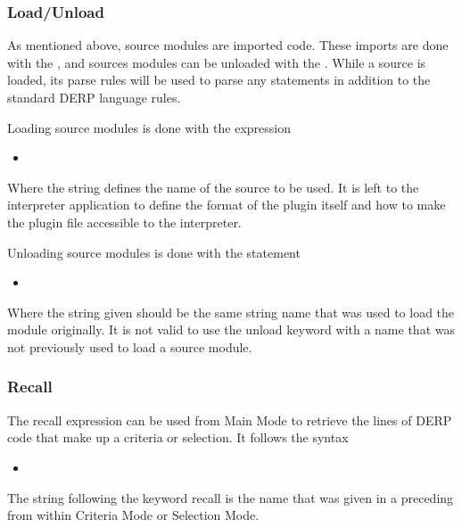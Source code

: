 \subsubsection{Load/Unload}
As mentioned above, source modules are imported code. These imports are done with the ,
and sources modules can be unloaded with the . While a source is loaded, its parse
rules will be used to parse any statements in addition to the standard DERP language rules.

Loading source modules is done with the expression
\begin{itemize}[leftmargin=2in]
    \item[\nonterminal{load\_expression}] \bnf{:}  
\end{itemize}

Where the string defines the name of the source to be used. It is left to the interpreter application to define
the format of the plugin itself and how to make the plugin file accessible to the interpreter.

Unloading source modules is done with the statement
\begin{itemize}[leftmargin=2in]
    \item[\nonterminal{unload\_expression}] \bnf{:}  
\end{itemize}

Where the string given should be the same string name that was used to load the module originally.
It is not valid to use the unload keyword with a name that was not previously used to load a source module.



\subsubsection{Recall}
The recall expression can be used from Main Mode to retrieve the lines of DERP code that make up a
criteria or selection. It follows the syntax
\begin{itemize}[leftmargin=2in]
    \item[\nonterminal{recall\_expression}] \bnf{:}  
\end{itemize}

The string following the keyword recall is the name that was given in a preceding  from
within Criteria Mode or Selection Mode.

